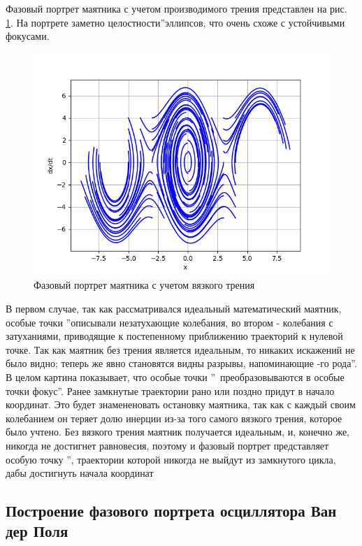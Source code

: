 Фазовый портрет маятника с учетом производимого трения представлен на рис. \ref{fig:16}.
На портрете заметно  целостности\textquotedblright эллипсов, что очень схоже с устойчивыми фокусами. 

\begin{figure}[H]
	\centering
	\includegraphics[width=0.7\linewidth]{body/images/Pendulum-system-with-drag.png}
	\caption{Фазовый портрет маятника с учетом вязкого трения}
	\label{fig:16}
\end{figure}

В первом случае, так как рассматривался идеальный математический маятник, особые точки \textquotedblright описывали незатухающие колебания,
во втором - колебания с затуханиями, приводящие к постепенному приближению траекторий к нулевой точке.
Так как маятник без трения является идеальным, то никаких искажений не было видно; теперь же явно становятся видны разрывы,
напоминающие -го рода\textquotedblright. В целом картина показывает, что особые точки \textquotedblright\ 
преобразовываются в особые точки  фокус\textquotedblright. Ранее замкнутые траектории рано или поздно придут в начало координат.
Это будет знамененовать остановку маятника, так как с каждый своим колебанием он теряет долю инерции из-за того самого вязкого трения, которое было учтено.
Без вязкого трения маятник получается идеальным, и, конечно же, никогда не достигнет равновесия, поэтому и фазовый портрет представляет особую точку
\textquotedblleftцентр\textquotedblright, траектории которой никогда не выйдут из замкнутого цикла, дабы достигнуть начала координат

\subsection{Построение фазового портрета осциллятора Ван дер Поля}

